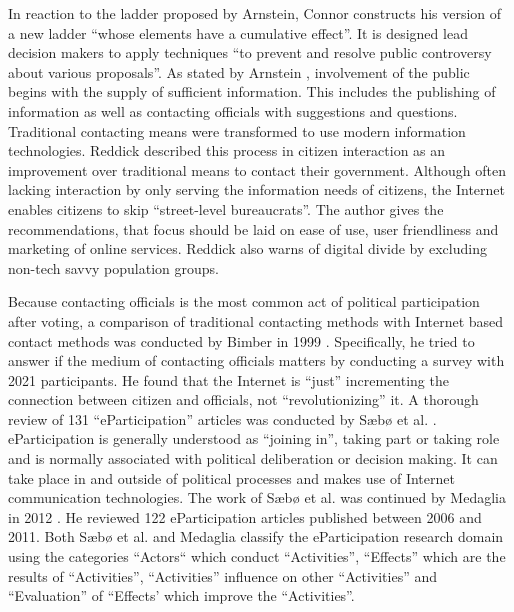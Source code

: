 In reaction to the ladder proposed by Arnstein, Connor \cite{Connor1988_new_ladder} constructs his version of a new ladder ``whose elements have a cumulative effect''. It is designed lead decision makers to apply techniques ``to prevent and resolve public controversy about various proposals''. 
As stated by Arnstein \cite{Arnstein1969_citizen_participation}, involvement of the public begins with the supply of sufficient information.  This includes the publishing of information as well as contacting officials with suggestions and questions. Traditional contacting means were transformed to use modern information technologies. Reddick \cite{Reddick2005_Citizen_interaction_with_egovernment} described this process in citizen interaction as an improvement over traditional means to contact their government. Although often lacking interaction by only serving the information needs of citizens, the Internet enables citizens to skip ``street-level bureaucrats''. The author gives the recommendations, that focus should be laid on ease of use, user friendliness and marketing of online services. Reddick also warns of digital divide by excluding non-tech savvy population groups.

Because contacting officials is the most common act of political participation after voting, a comparison of traditional contacting methods with Internet based contact methods was conducted by Bimber in 1999 \cite{Bimber1999_Citizen_communication_with_government}. Specifically, he tried to answer if the medium of contacting officials matters by conducting a survey with 2021 participants. He found that the Internet is ``just'' incrementing the connection between citizen and officials, not ``revolutionizing'' it.
A thorough review of 131 ``eParticipation'' articles was conducted by S{\ae}b{\o} et al. \cite{Saebo_eParticipation}. eParticipation is generally understood as ``joining in'', taking part or taking role and is normally associated with political deliberation or decision making. It can take place in and outside of political processes and makes use of Internet communication technologies. The work of S{\ae}b{\o} et al. was continued by Medaglia in 2012 \cite{Medaglia2012_eParticipation}. He reviewed 122 eParticipation articles published between 2006 and 2011. Both S{\ae}b{\o} et al. and Medaglia classify the eParticipation research domain using the categories ``Actors`` which conduct ``Activities'', ``Effects'' which are the results of ``Activities'', ``Activities'' influence on other ``Activities'' and ``Evaluation'' of ``Effects' which improve the ``Activities''. 

